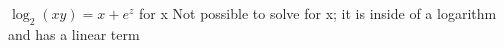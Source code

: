 {$\log_2{(xy)=x+e^z}$ for x}
{Not possible to solve for x; it is inside of a logarithm and has a linear term}
